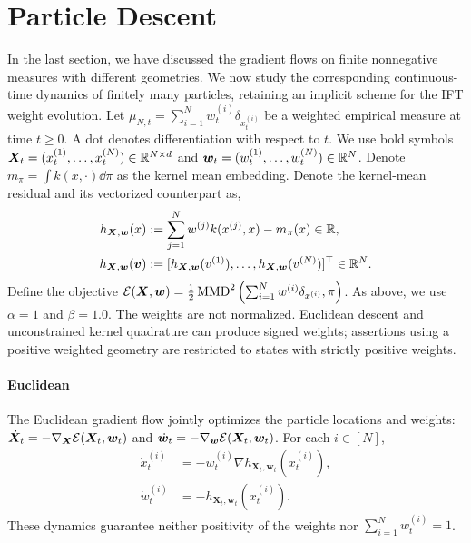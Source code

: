 \section{Particle Descent}\label{sec:pd}
In the last section, we have discussed the gradient flows on finite nonnegative measures with different geometries.
We now study the corresponding continuous-time dynamics of finitely many particles, retaining an implicit scheme for the IFT weight evolution.
Let $\mu_{N,t}=\sum_{i=1}^N w_t^{(i)} \delta_{x_t^{(i)}}$ be a weighted empirical measure at time $t\geq0$. A dot denotes differentiation with respect to $t$. We use bold symbols $\bm{X}_t=(x_t^{(1)},\ldots, x_t^{(N)}) \in\mathbb{R}^{N\times d}$ and $\bm{w}_t=(w_t^{(1)},\ldots, w_t^{(N)})\in\mathbb{R}^N$.
Denote $m_\pi=\int k(x,\cdot)\dd \pi$ as the kernel mean embedding. 
Denote the kernel-mean residual and its vectorized counterpart as,  
\begin{align*}
h_{\bm{X},\bm{w}}(x)
&:= \sum_{j=1}^N w^{(j)} k(x^{(j)},x)-m_\pi(x) \in \mathbb{R}, \\
h_{\bm{X},\bm{w}}(\bm{v})
&:= [h_{\bm{X},\bm{w}}(v^{(1)}), \ldots,
h_{\bm{X},\bm{w}}(v^{(N)})]^\top \in \mathbb{R}^N .
\end{align*}
Define the objective $\mathcal{E}(\bm{X},\bm{w}) = \frac{1}{2}\operatorname{MMD}^2\left(\sum_{i=1}^N w^{(i)}\delta_{x^{(i)}},\pi \right)$.
As above, we use $\alpha=1$ and $\beta=1.0$. The weights are not normalized. Euclidean descent and unconstrained kernel quadrature can produce signed weights; assertions using a positive weighted geometry are restricted to states with strictly positive weights.

\paragraph{Euclidean}
The Euclidean gradient flow jointly optimizes the particle locations and weights: $\dot{\bm{X}}_t=-\nabla_{\bm{X}}\mathcal{E}(\bm{X}_t,\bm{w}_t)$ and $\dot{\bm{w}}_t=-\nabla_{\bm{w}}\mathcal{E}(\bm{X}_t,\bm{w}_t)$. For each $i\in[N]$,
\begin{align*}\label{eq:e-pd}
    \dot{x}_t^{(i)}
    &=-w_t^{(i)}\nabla h_{\bm{X}_t,\bm{w}_t}\left(x_t^{(i)}\right), \\
    \dot{w}_t^{(i)}
    &=-h_{\bm{X}_t,\bm{w}_t}\left(x_t^{(i)}\right). \tag{E-PD}
\end{align*}
These dynamics guarantee neither positivity of the weights nor $\sum_{i=1}^N w_t^{(i)}=1$.

